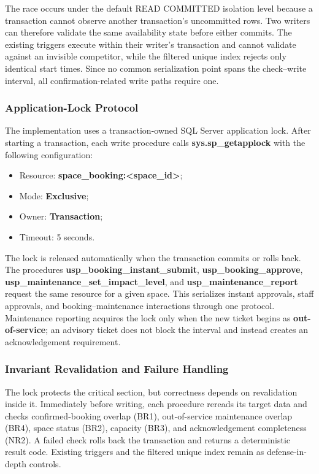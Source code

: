 The race occurs under the default READ COMMITTED isolation level
because a transaction cannot observe another transaction's uncommitted rows.
Two writers can therefore validate the same availability state before either
commits. The existing triggers execute within their writer's transaction and
cannot validate against an invisible competitor, while the filtered unique
index rejects only identical start times. Since no common serialization point
spans the check--write interval, all confirmation-related write paths require
one.

\subsubsection{Application-Lock Protocol}

The implementation uses a transaction-owned SQL Server application lock. After
starting a transaction, each write procedure calls
\textbf{sys.sp\_getapplock} with the following configuration:

\begin{itemize}
    \item Resource: \textbf{space\_booking:<space\_id>};
    \item Mode: \textbf{Exclusive};
    \item Owner: \textbf{Transaction};
    \item Timeout: 5 seconds.
\end{itemize}

The lock is released automatically when the transaction commits or rolls back.
The procedures \textbf{usp\_booking\_instant\_submit},
\textbf{usp\_booking\_approve},
\textbf{usp\_maintenance\_set\_impact\_level}, and
\textbf{usp\_maintenance\_report} request the same resource for a given space.
This serializes instant approvals, staff approvals, and booking--maintenance
interactions through one protocol. Maintenance reporting acquires the lock only
when the new ticket begins as \textbf{out-of-service}; an advisory ticket does
not block the interval and instead creates an acknowledgement requirement.

\subsubsection{Invariant Revalidation and Failure Handling}

The lock protects the critical section, but correctness depends on revalidation
inside it. Immediately before writing, each procedure rereads its target data
and checks confirmed-booking overlap (BR1), out-of-service maintenance overlap
(BR4), space status (BR2), capacity (BR3), and acknowledgement completeness
(NR2). A failed check rolls back the transaction and returns a deterministic
result code. Existing triggers and the filtered unique index remain as
defense-in-depth controls.

